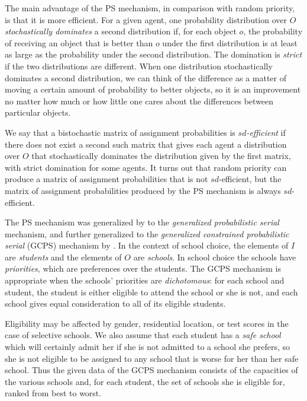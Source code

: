 \documentclass[12pt]{article}
\theoremstyle{definition}
\begin{document}
The main advantage of the PS mechanism, in comparison with random
priority, is that it is more efficient.  For a given agent, one
probability distribution over $O$ \emph{stochastically dominates} a
second distribution if, for each object $o$, the probability of
receiving an object that is better than $o$ under the first
distribution is at least as large as the probability under the second
distribution.  The domination is \emph{strict} if the two
distributions are different. When one distribution stochastically
dominates a second distribution, we can think of the difference as a
matter of moving a certain amount of probability to better objects, so
it is an improvement no matter how much or how little one cares about
the differences between particular objects.

We say that a bistochastic matrix of assignment probabilities is
\emph{$sd$-efficient} if there does not exist a second such matrix
that gives each agent a distribution over $O$ that stochastically
dominates the distribution given by the first matrix, with strict
domination for some agents.  It turns out that random priority can
produce a matrix of assignment probabilities that is not
$sd$-efficient, but the matrix of assignment probabilities produced by
the PS mechanism is always $sd$-efficient.

The PS mechanism was generalized by \cite{bckm13aer} to the
\emph{generalized probabilistic serial} mechanism, and further
generalized to the \emph{generalized constrained probabilistic serial}
(GCPS) mechanism by \cite{balbuzanov22jet}.  In the context of school
choice, the elements of $I$ are \emph{students} and the elements of
$O$ are \emph{schools}.  In school choice the schools have
\emph{priorities}, which are preferences over the students.  The GCPS
mechanism is appropriate when the schools' priorities are
\emph{dichotomous}: for each school and student, the student is either
eligible to attend the school or she is not, and each school gives
equal consideration to all of its eligible students.

Eligibility may be affected by gender, residential location, or test
scores in the case of selective schools.  We also assume that each
student has a \emph{safe school} which will certainly admit her if she
is not admitted to a school she prefers, so she is not eligible to be
assigned to any school that is worse for her than her safe school.
Thus the given data of the GCPS mechanism consists of the capacities
of the various schools and, for each student, the set of schools she
is eligible for, ranked from best to worst.
\end{document}
